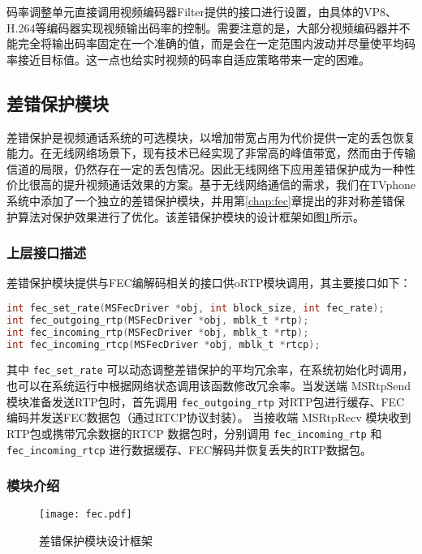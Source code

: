     码率调整单元直接调用视频编码器Filter提供的接口进行设置，由具体的VP8、H.264等编码器实现视频输出码率的控制。需要注意的是，大部分视频编码器并不能完全将输出码率固定在一个准确的值，而是会在一定范围内波动并尽量使平均码率接近目标值。这一点也给实时视频的码率自适应策略带来一定的困难。


\subsection{差错保护模块}
差错保护是视频通话系统的可选模块，以增加带宽占用为代价提供一定的丢包恢复能力。在无线网络场景下，现有技术已经实现了非常高的峰值带宽，然而由于传输信道的局限，仍然存在一定的丢包情况。因此无线网络下应用差错保护成为一种性价比很高的提升视频通话效果的方案。基于无线网络通信的需求，我们在TVphone系统中添加了一个独立的差错保护模块，并用第\ref{chap:fec}章提出的非对称差错保护算法对保护效果进行了优化。该差错保护模块的设计框架如图\ref{fig:fec_arch}所示。

    \subsubsection{上层接口描述}
    差错保护模块提供与FEC编解码相关的接口供oRTP模块调用，其主要接口如下：
    \begin{lstlisting}[language=C]
int fec_set_rate(MSFecDriver *obj, int block_size, int fec_rate);
int fec_outgoing_rtp(MSFecDriver *obj, mblk_t *rtp);
int fec_incoming_rtp(MSFecDriver *obj, mblk_t *rtp);
int fec_incoming_rtcp(MSFecDriver *obj, mblk_t *rtcp);
    \end{lstlisting}

    其中 \lstinline!fec_set_rate! 可以动态调整差错保护的平均冗余率，在系统初始化时调用，也可以在系统运行中根据网络状态调用该函数修改冗余率。当发送端 MSRtpSend 模块准备发送RTP包时，首先调用 \lstinline!fec_outgoing_rtp! 对RTP包进行缓存、FEC编码并发送FEC数据包（通过RTCP协议封装）。 当接收端 MSRtpRecv 模块收到RTP包或携带冗余数据的RTCP 数据包时，分别调用 \lstinline!fec_incoming_rtp! 和 \lstinline!fec_incoming_rtcp! 进行数据缓存、FEC解码并恢复丢失的RTP数据包。

    \subsubsection{模块介绍}
    \begin{figure}[htbp]
      \centering
      \texttt{[image: fec.pdf]}
      \caption{差错保护模块设计框架}
      \label{fig:fec_arch}
    \end{figure}

